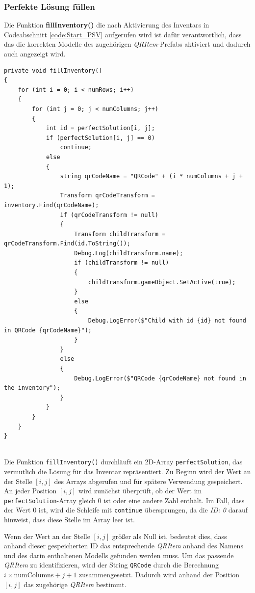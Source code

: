 \subsubsection{Perfekte Lösung füllen}
Die Funktion \textbf{fillInventory()} die nach Aktivierung des Inventars in Codeabschnitt \ref{code:Start_PSV} aufgerufen
wird ist dafür verantwortlich, dass das die korrekten Modelle des zugehörigen \textit{QRItem}-Prefabs aktiviert
und dadurch auch angezeigt wird.

\begin{lstlisting}[style=csharp, caption={Inventar füllen}, label=code:invFül_PSV]
private void fillInventory()
{
    for (int i = 0; i < numRows; i++)
    {
        for (int j = 0; j < numColumns; j++)
        {
            int id = perfectSolution[i, j];
            if (perfectSolution[i, j] == 0)
                continue;
            else
            {
                string qrCodeName = "QRCode" + (i * numColumns + j + 1);
                Transform qrCodeTransform = inventory.Find(qrCodeName);
                if (qrCodeTransform != null)
                {
                    Transform childTransform = qrCodeTransform.Find(id.ToString());
                    Debug.Log(childTransform.name);
                    if (childTransform != null)
                    {
                        childTransform.gameObject.SetActive(true);
                    }
                    else
                    {
                        Debug.LogError($"Child with id {id} not found in QRCode {qrCodeName}");
                    }
                }
                else
                {
                    Debug.LogError($"QRCode {qrCodeName} not found in the inventory");
                }
            }
        }
    }
}
\end{lstlisting}\\
Die Funktion \texttt{fillInventory()} durchläuft ein 2D-Array \texttt{perfectSolution}, das vermutlich die Lösung für
das Inventar repräsentiert. Zu Beginn wird der Wert an der Stelle $[i, j]$ des Arrays abgerufen und für spätere Verwendung
gespeichert. An jeder Position $[i, j]$ wird zunächst überprüft, ob der Wert im \texttt{perfectSolution}-Array gleich $0$
ist oder eine andere Zahl enthält. Im Fall, dass der Wert $0$ ist, wird die Schleife mit \texttt{continue} übersprungen,
da die \textit{ID: 0} darauf hinweist, dass diese Stelle im Array leer ist.

Wenn der Wert an der Stelle $[i, j]$ größer als Null ist, bedeutet dies, dass anhand dieser gespeicherten ID das
entsprechende \textit{QRItem} anhand des Namens und des darin enthaltenen Modells gefunden werden muss. Um das passende
\textit{QRItem} zu identifizieren, wird der String \texttt{QRCode} durch die Berechnung $i \times \text{numColumns} + j + 1$
zusammengesetzt. Dadurch wird anhand der Position $[i, j]$ das zugehörige \textit{QRItem} bestimmt.\\

